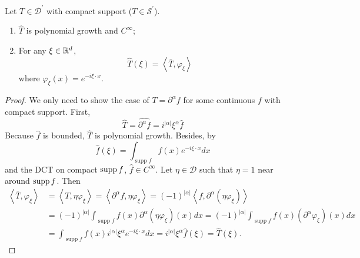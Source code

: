 \begin{enumerate}
	\begin{prop}
		Let $T \in \mathcal{D}^\prime$ with compact support ($T \in \mathcal{S}^\prime$).
		\begin{enumerate}
			\item $\widehat{T}$ is polynomial growth and $C^\infty$;
			\item For any $\xi \in \mathbb{R}^d$,
			\begin{equation*}
				\widehat{T}(\xi)=\left\langle\bar{T}, \varphi_{\xi}\right\rangle
			\end{equation*}
			where $\varphi_{\xi}(x)=e^{-i \xi \cdot x}$.
		\end{enumerate}
	\end{prop}
	\begin{proof}
		We only need to show the case of $T = \partial^\alpha f$ for some continuous $f$ with compact support. First,
		\begin{equation*}
			\widehat{T}=\widehat{\partial^\alpha f}=i^{|\alpha|} \xi^\alpha \widehat{f}
		\end{equation*}
		Because $\widehat{f}$ is bounded, $\widehat{T}$ is polynomial growth. Besides, by
		\begin{equation*}
			\widehat{f}(\xi)=\int_{\operatorname{supp} f} f(x) e^{-i \xi \cdot x} d x
		\end{equation*}
		and the DCT on compact $\operatorname{supp} f$, $\widehat{f} \in C^\infty$. Let $\eta \in \mathcal{D}$ such that $\eta = 1$ near around $\operatorname{supp} f$. Then
		\begin{equation*}
			\begin{aligned}
				\left\langle\bar{T}, \varphi_{\xi}\right\rangle & =\left\langle T, \eta \varphi_{\xi}\right\rangle=\left\langle\partial^\alpha f, \eta \varphi_{\xi}\right\rangle=(-1)^{|\alpha|}\left\langle f, \partial^\alpha\left(\eta \varphi_{\xi}\right)\right\rangle \\
				& =(-1)^{|\alpha|} \int_{\operatorname{supp} f} f(x) \partial^\alpha\left(\eta \varphi_{\xi}\right)(x) d x=(-1)^{|\alpha|} \int_{\operatorname{supp} f} f(x)\left(\partial^\alpha \varphi_{\xi}\right)(x) d x \\
				& =\int_{\operatorname{supp} f} f(x) i^{|\alpha|} \xi^\alpha e^{-i \xi \cdot x} d x=i^{|\alpha|} \xi^\alpha \widehat{f}(\xi)=\widehat{T}(\xi) .
			\end{aligned}
		\end{equation*}
	\end{proof}


\end{enumerate}
